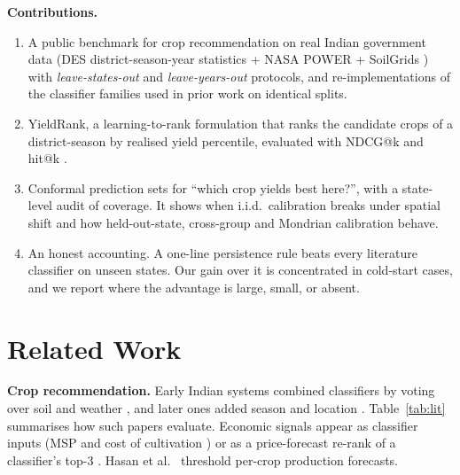 \documentclass[conference]{IEEEtran}
\begin{document}
\textbf{Contributions.}
\begin{enumerate}
\item A public benchmark for crop recommendation on real Indian government data
(DES district-season-year statistics \cite{ogdindia} + NASA POWER \cite{nasapower} + SoilGrids
\cite{poggio2021}) with \emph{leave-states-out} and \emph{leave-years-out} protocols, and
re-implementations of the classifier families used in prior work on identical splits.
\item YieldRank, a learning-to-rank formulation that ranks the candidate crops of a
district-season by realised yield percentile, evaluated with NDCG@k and hit@k
\cite{jarvelin2002}.
\item Conformal prediction sets for ``which crop yields best here?'', with a state-level
audit of coverage. It shows when i.i.d.\ calibration breaks under spatial shift and how
held-out-state, cross-group and Mondrian calibration behave.
\item An honest accounting. A one-line persistence rule beats every literature classifier on
unseen states. Our gain over it is concentrated in cold-start cases, and we report where the
advantage is large, small, or absent.
\end{enumerate}

\section{Related Work}\label{sec:related}

\textbf{Crop recommendation.} Early Indian systems combined classifiers by voting over soil and
weather \cite{pudumalar2017,kulkarni2018}, and later ones added season and location
\cite{doshi2018,priyadharshini2021}. Table~\ref{tab:lit} summarises how such papers evaluate. Economic signals appear as classifier inputs (MSP and cost of cultivation
\cite{sam2025}) or as a price-forecast re-rank of a classifier's top-3 \cite{sindhur2025}. Hasan
et al.\ \cite{hasan2023} threshold per-crop production forecasts.
\end{document}
